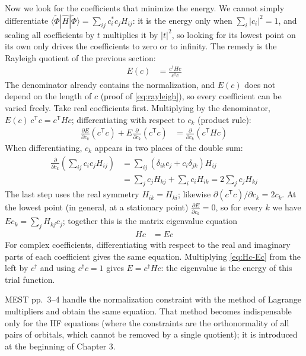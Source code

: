 Now we look for the coefficients that minimize the energy. We cannot simply differentiate $\langle\tilde{\Phi}|\hat{H}|\tilde{\Phi}\rangle = \sum_{ij} c_i^* c_j H_{ij}$: it is the energy only when $\sum_i |c_i|^2 = 1$, and scaling all coefficients by $t$ multiplies it by $|t|^2$, so looking for its lowest point on its own only drives the coefficients to zero or to infinity. The remedy is the Rayleigh quotient of the previous section:
\begin{align*}
E(c) &= \frac{c^\dagger H c}{c^\dagger c}
\end{align*}
The denominator already contains the normalization, and $E(c)$ does not depend on the length of $c$ (proof of \eqref{eq:rayleigh}), so every coefficient can be varied freely. Take real coefficients first. Multiplying by the denominator, $E(c)\, c^{\mathsf T} c = c^{\mathsf T} H c$; differentiating with respect to $c_k$ (product rule):
\begin{align*}
\frac{\partial E}{\partial c_k} (c^{\mathsf T} c) + E \frac{\partial}{\partial c_k}(c^{\mathsf T} c) &= \frac{\partial}{\partial c_k}(c^{\mathsf T} H c)
\end{align*}
When differentiating, $c_k$ appears in two places of the double sum:
\begin{align*}
\frac{\partial}{\partial c_k} \left(\sum_{ij} c_i c_j H_{ij}\right) &= \sum_{ij} (\delta_{ik} c_j + c_i \delta_{jk}) H_{ij} \\
&= \sum_j c_j H_{kj} + \sum_i c_i H_{ik} = 2 \sum_j c_j H_{kj}
\end{align*}
The last step uses the real symmetry $H_{ik} = H_{ki}$; likewise $\partial (c^{\mathsf T} c) / \partial c_k = 2 c_k$. At the lowest point (in general, at a stationary point) $\frac{\partial E}{\partial c_k} = 0$, so for every $k$ we have $E c_k = \sum_j H_{kj} c_j$; together this is the matrix eigenvalue equation
\begin{align}\label{eq:Hc-Ec}
H c &= E c
\end{align}
For complex coefficients, differentiating with respect to the real and imaginary parts of each coefficient gives the same equation. Multiplying \eqref{eq:Hc-Ec} from the left by $c^\dagger$ and using $c^\dagger c = 1$ gives $E = c^\dagger H c$: the eigenvalue is the energy of this trial function.

MEST pp.~3--4 handle the normalization constraint with the method of Lagrange multipliers and obtain the same equation. That method becomes indispensable only for the HF equations (where the constraints are the orthonormality of all pairs of orbitals, which cannot be removed by a single quotient); it is introduced at the beginning of Chapter 3.

